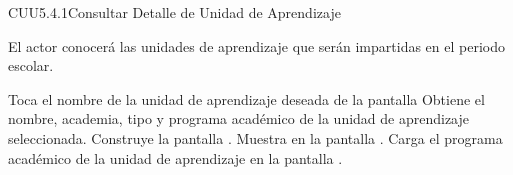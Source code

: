 \begin{UseCase}{CUU5.4.1}{Consultar Detalle de Unidad de Aprendizaje}
{\begin{UClist}
				 El actor conocerá las unidades de aprendizaje que serán impartidas en el periodo escolar.
			\end{UClist}
		}
	\end{UseCase}
	
	
	\begin{UCtrayectoria}
		\UCpaso[\UCactor] Toca el nombre de la unidad de aprendizaje deseada de la pantalla 
		\UCpaso[\UCsist] Obtiene el nombre, academia, tipo y programa académico de la unidad de aprendizaje seleccionada.
		\UCpaso[\UCsist] Construye la pantalla .
		\UCpaso[\UCsist] Muestra en la pantalla .
		\UCpaso[\UCsist] Carga el programa académico de la unidad de aprendizaje en la pantalla .
		
	\end{UCtrayectoria}
	
	
	
	
	
